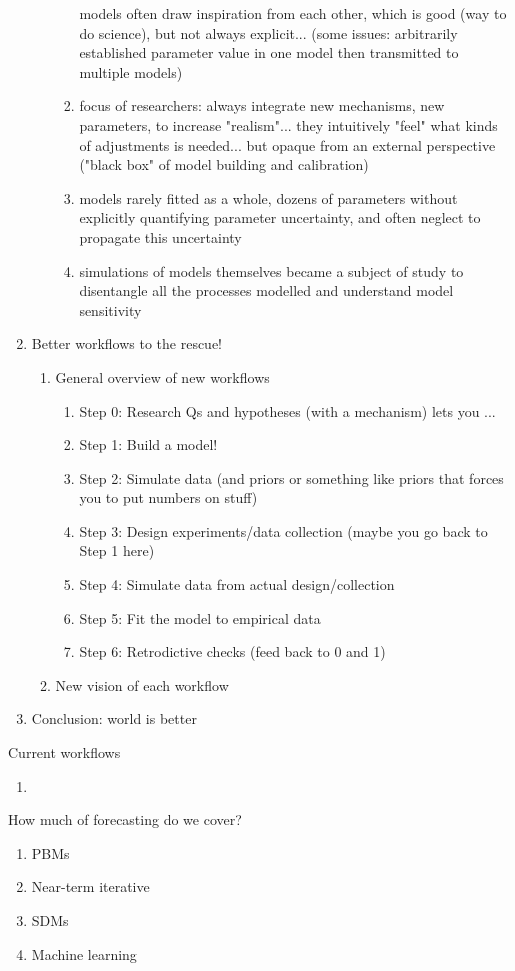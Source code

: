 \documentclass[11pt]{article}
\begin{document}
\begin{enumerate}
\begin{enumerate}
\begin{enumerate}
models often draw inspiration from each other, which is good (way to do science), but not always explicit... (some issues: arbitrarily established parameter value in one model then transmitted to multiple models)
\item focus of researchers: always integrate new mechanisms, new parameters, to increase "realism"...  they intuitively "feel" what kinds of adjustments is needed... but opaque from an external perspective ("black box" of model building and calibration)
\item models rarely fitted as a whole, dozens of parameters without explicitly quantifying parameter uncertainty, and often neglect to propagate this uncertainty
\item simulations of models themselves became a subject of study to disentangle all the processes modelled and understand model sensitivity 
\end{enumerate}
\end{enumerate}
\item Better workflows to the rescue! 
\begin{enumerate}
\item General overview of new workflows
\begin{enumerate}
\item Step 0: Research Qs and hypotheses (with a mechanism) lets you ...
\item Step 1: Build a model!
\item Step 2: Simulate data (and priors or something like priors that forces you to put numbers on stuff)
\item Step 3: Design experiments/data collection (maybe you go back to Step 1 here)
\item Step 4: Simulate data from actual design/collection
\item Step 5: Fit the model to empirical data
\item Step 6: Retrodictive checks (feed back to 0 and 1)
\end{enumerate}
\item New vision of each workflow
\end{enumerate}
\item Conclusion: world is better
\end{enumerate}

Current workflows
\begin{enumerate}
\item 
\end{enumerate}

How much of forecasting do we cover?
\begin{enumerate}
\item PBMs
\item Near-term iterative
\item SDMs
\item Machine learning
\end{enumerate}
\end{document}
